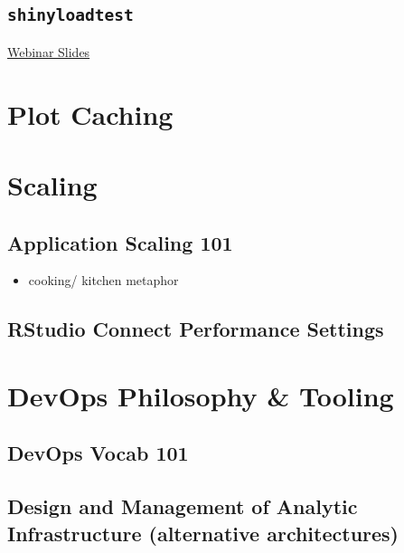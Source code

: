 \documentclass[]{book}
\providecommand{\tightlist}{%
  \setlength{\itemsep}{0pt}\setlength{\parskip}{0pt}}
\theoremstyle{definition}
\theoremstyle{definition}
\theoremstyle{definition}
\theoremstyle{remark}
\begin{document}
\hypertarget{shinyloadtest}{%
\section{\texorpdfstring{\texttt{shinyloadtest}}{shinyloadtest}}\label{shinyloadtest}}

\href{https://github.com/rstudio/webinars/blob/master/63-shinyloadtest/slides.pdf}{Webinar
Slides}

\hypertarget{plot-caching}{%
\chapter{Plot Caching}\label{plot-caching}}

\hypertarget{scaling}{%
\chapter{Scaling}\label{scaling}}

\hypertarget{application-scaling-101}{%
\section{Application Scaling 101}\label{application-scaling-101}}

\begin{itemize}
\tightlist
\item
  cooking/ kitchen metaphor
\end{itemize}

\hypertarget{rstudio-connect-performance-settings}{%
\section{RStudio Connect Performance
Settings}\label{rstudio-connect-performance-settings}}

\hypertarget{devops-philosophy-tooling}{%
\chapter{DevOps Philosophy \& Tooling}\label{devops-philosophy-tooling}}

\hypertarget{devops-vocab-101}{%
\section{DevOps Vocab 101}\label{devops-vocab-101}}

\hypertarget{design-and-management-of-analytic-infrastructure-alternative-architectures}{%
\section{Design and Management of Analytic Infrastructure (alternative
architectures)}\label{design-and-management-of-analytic-infrastructure-alternative-architectures}}
\end{document}
